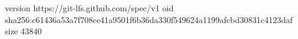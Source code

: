 version https://git-lfs.github.com/spec/v1
oid sha256:c61436a53a7f708ce41a9501f6b36da330f549624a1199afcbd30831c4123daf
size 43840

